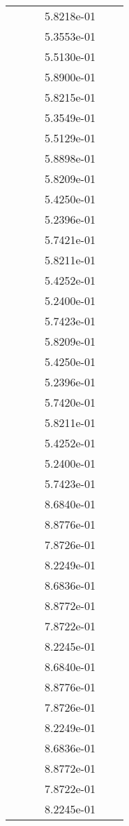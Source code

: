 \begin{xltabular}{\textwidth}{r|rS[table-format=1.3e+2]S[table-format=1.4e+2]S[table-format=1.4e+2]S[table-format=-1.5]}
&  &  & 5.8218e-01 & & \\
&  &  & 5.3553e-01 & & \\
&  &  & 5.5130e-01 & & \\
&  &  & 5.8900e-01 & & \\
&  &  & 5.8215e-01 & & \\
&  &  & 5.3549e-01 & & \\
&  &  & 5.5129e-01 & & \\
&  &  & 5.8898e-01 & & \\
&  &  & 5.8209e-01 & & \\
&  &  & 5.4250e-01 & & \\
&  &  & 5.2396e-01 & & \\
&  &  & 5.7421e-01 & & \\
&  &  & 5.8211e-01 & & \\
&  &  & 5.4252e-01 & & \\
&  &  & 5.2400e-01 & & \\
&  &  & 5.7423e-01 & & \\
&  &  & 5.8209e-01 & & \\
&  &  & 5.4250e-01 & & \\
&  &  & 5.2396e-01 & & \\
&  &  & 5.7420e-01 & & \\
&  &  & 5.8211e-01 & & \\
&  &  & 5.4252e-01 & & \\
&  &  & 5.2400e-01 & & \\
&  &  & 5.7423e-01 & & \\
&  &  & 8.6840e-01 & & \\
&  &  & 8.8776e-01 & & \\
&  &  & 7.8726e-01 & & \\
&  &  & 8.2249e-01 & & \\
&  &  & 8.6836e-01 & & \\
&  &  & 8.8772e-01 & & \\
&  &  & 7.8722e-01 & & \\
&  &  & 8.2245e-01 & & \\
&  &  & 8.6840e-01 & & \\
&  &  & 8.8776e-01 & & \\
&  &  & 7.8726e-01 & & \\
&  &  & 8.2249e-01 & & \\
&  &  & 8.6836e-01 & & \\
&  &  & 8.8772e-01 & & \\
&  &  & 7.8722e-01 & & \\
&  &  & 8.2245e-01 & & \\

\end{xltabular}
